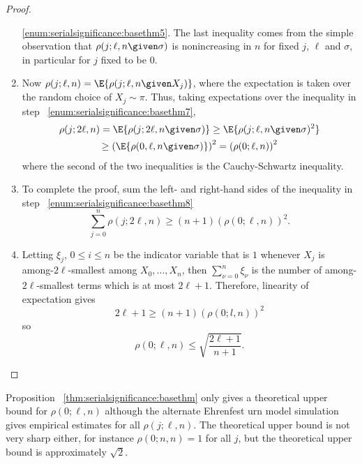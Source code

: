 \documentclass[12pt]{article}
\begin{document}
\begin{proof}
\begin{enumerate}
            \ref{enum:serialsignificance:basethm5}.  The last inequality
            comes from the simple observation that \( \rho(j; \ell, n
            \given \sigma) \) is nonincreasing in \( n \) for fixed \( j
            \), \( \ell \) and \( \sigma \), in particular for \( j \)
            fixed to be \( 0 \).
        \item
            \label{enum:serialsignificance:basethm8} Now \( \rho(j;\ell,n)
            = \E{\rho(j; \ell, n \given X_j)} \), where the expectation
            is taken over the random choice of \( X_j \sim \pi \). Thus,
            taking expectations over the inequality in step~%
            \ref{enum:serialsignificance:basethm7},
            \begin{multline}
                \rho(j; 2\ell, n) = \E{\rho(j; 2\ell, n \given \sigma)}
                \ge \E{\rho(j; \ell, n \given \sigma)^2} \\
                \ge \left( \E{\rho(0, \ell, n \given \sigma)}\right)^2 =
                \left( \rho(0; \ell, n) \right)^2
            \end{multline}
            where the second of the two inequalities is the
            Cauchy-Schwartz inequality.
        \item
            To complete the proof, sum the left- and right-hand sides of
            the inequality in step~%
            \ref{enum:serialsignificance:basethm8}
            \[
                \sum\limits_{j=0}^n \rho(j; 2\ell, n) \ge (n+1) (\rho(0;
                \ell, n))^2.
            \]
        \item
            Letting \( \xi_j \), \( 0 \le i \le n \) be the indicator
            variable that is \( 1 \) whenever \( X_j \) is among-\( 2\ell
            \)-smallest among \( X_0, \dots , X_n \), then \( \sum_{\nu=0}^n
            \xi_{\nu} \) is the number of among-\( 2\ell \)-smallest
            terms which is at most \( 2\ell + 1 \).  Therefore,
            linearity of expectation gives
            \[
                2\ell + 1 \ge (n + 1)(\rho(0; l,n) )^2
            \] so
            \[
                \rho(0; \ell, n) \le \sqrt{ \frac{2\ell + 1}{n+1}}.
            \]
    \end{enumerate}
\end{proof}

\begin{remark}
    Proposition~%
    \ref{thm:serialsignificance:basethm} only gives a theoretical upper
    bound for \( \rho(0; \ell, n) \) although the alternate Ehrenfest
    urn model simulation gives empirical estimates for all \( \rho(j;
    \ell, n) \).  The theoretical upper bound is not very sharp either,
    for instance \( \rho(0; n, n) = 1 \) for all \( j \), but the
    theoretical upper bound is approximately \( \sqrt{2} \).

\end{remark}
\end{document}
